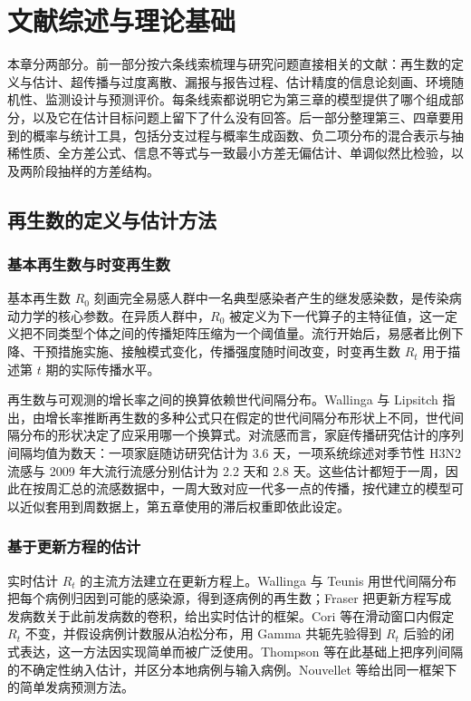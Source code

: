 \chapter{文献综述与理论基础}
\label{chap:lit}

本章分两部分。前一部分按六条线索梳理与研究问题直接相关的文献：再生数的定义与估计、超传播与过度离散、漏报与报告过程、估计精度的信息论刻画、环境随机性、监测设计与预测评价。每条线索都说明它为第三章的模型提供了哪个组成部分，以及它在估计目标问题上留下了什么没有回答。后一部分整理第三、四章要用到的概率与统计工具，包括分支过程与概率生成函数、负二项分布的混合表示与抽稀性质、全方差公式、信息不等式与一致最小方差无偏估计、单调似然比检验，以及两阶段抽样的方差结构。

\section{再生数的定义与估计方法}
\label{sec:lit-rt}

\subsection{基本再生数与时变再生数}

基本再生数 $R_0$ 刻画完全易感人群中一名典型感染者产生的继发感染数，是传染病动力学的核心参数\citep{anderson1991infectious, keeling2008modeling}。在异质人群中，$R_0$ 被定义为下一代算子的主特征值\citep{diekmann1990definition}，这一定义把不同类型个体之间的传播矩阵压缩为一个阈值量。流行开始后，易感者比例下降、干预措施实施、接触模式变化，传播强度随时间改变，时变再生数 $R_t$ 用于描述第 $t$ 期的实际传播水平。

再生数与可观测的增长率之间的换算依赖世代间隔分布。Wallinga 与 Lipsitch 指出，由增长率推断再生数的多种公式只在假定的世代间隔分布形状上不同，世代间隔分布的形状决定了应采用哪一个换算式\citep{wallinga2007generation}。对流感而言，家庭传播研究估计的序列间隔均值为数天：一项家庭随访研究估计为 3.6 天\citep{cowling2009estimation}，一项系统综述对季节性 H3N2 流感与 2009 年大流行流感分别估计为 2.2 天和 2.8 天\citep{vink2014serial}。这些估计都短于一周，因此在按周汇总的流感数据中，一周大致对应一代多一点的传播，按代建立的模型可以近似套用到周数据上，第五章使用的滞后权重即依此设定。

\subsection{基于更新方程的估计}

实时估计 $R_t$ 的主流方法建立在更新方程上。Wallinga 与 Teunis 用世代间隔分布把每个病例归因到可能的感染源，得到逐病例的再生数\citep{wallinga2004different}；Fraser 把更新方程写成发病数关于此前发病数的卷积，给出实时估计的框架\citep{fraser2007estimating}。Cori 等在滑动窗口内假定 $R_t$ 不变，并假设病例计数服从泊松分布，用 Gamma 共轭先验得到 $R_t$ 后验的闭式表达\citep{cori2013new}，这一方法因实现简单而被广泛使用。Thompson 等在此基础上把序列间隔的不确定性纳入估计，并区分本地病例与输入病例\citep{thompson2019improved}。Nouvellet 等给出同一框架下的简单发病预测方法\citep{nouvellet2018simple}。

